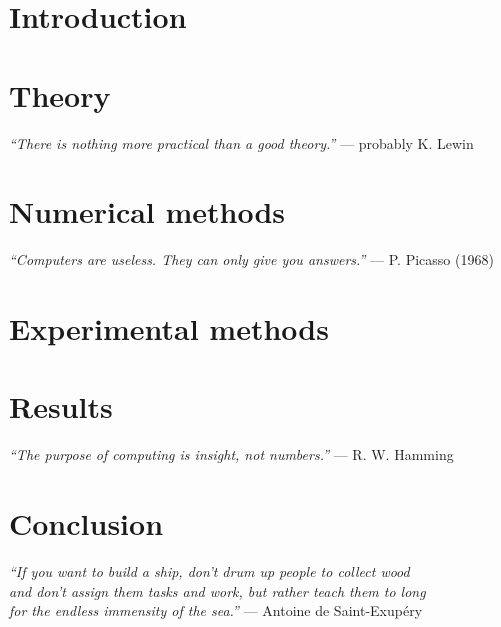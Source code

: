 \documentclass[a4paper,12pt]{report}
\begin{document}

\tableofcontents

\chapter{Introduction}


\chapter{Theory} 
\begin{flushright}  \textit{``There is nothing more practical than a good theory.''} --- probably K. Lewin \end{flushright}


\chapter{Numerical methods} 
\begin{flushright}  \textit{``Computers are useless. They can only give you answers.''} --- P. Picasso (1968) \end{flushright}


\chapter{Experimental methods}


\chapter{Results}
\begin{flushright} \textit{``The purpose of computing is insight, not numbers.''} --- R. W. Hamming \end{flushright}


\chapter{Conclusion}
\begin{flushright} \textit{``If you want to build a ship, don't drum up people to collect wood \\and don't assign them tasks and work, but rather teach them to long \\for the endless immensity of the sea.''} --- Antoine de Saint-Exup\'{e}ry \end{flushright}


\label{endtext} 

\printindex

\printbibliography



% 

\label{enddocument} 
\end{document}
